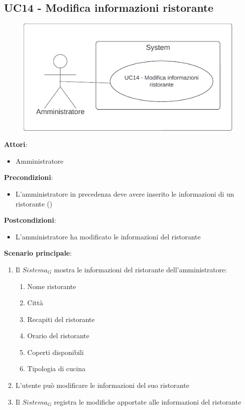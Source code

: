 \subsection{UC14 - Modifica informazioni ristorante} \label{usecase:14}
\begin{figure}[H]
    \centering
    \includegraphics[width=0.9\linewidth]{ucd/ucd14.png}
\end{figure}
\textbf{Attori}:
\begin{itemize}
    \item Amministratore
\end{itemize}
\textbf{Precondizioni}:
\begin{itemize}
    \item L'amministratore in precedenza deve avere inserito le informazioni di un ristorante ()
\end{itemize}
\textbf{Postcondizioni}:
\begin{itemize}
    \item L'amministratore ha modificato le informazioni del ristorante
\end{itemize}
\textbf{Scenario principale}:
\begin{enumerate}
    \item Il $\textit{Sistema}_G$ mostra le informazioni del ristorante dell'amministratore:
    \begin{enumerate}
        \item Nome ristorante
        \item Città
        \item Recapiti del ristorante
        \item Orario del ristorante
        \item Coperti disponibili
        \item Tipologia di cucina
    \end{enumerate}
    \item L'utente può modificare le informazioni del suo ristorante
    \item Il $\textit{Sistema}_G$ registra le modifiche apportate alle informazioni del ristorante
\end{enumerate}
\newpage